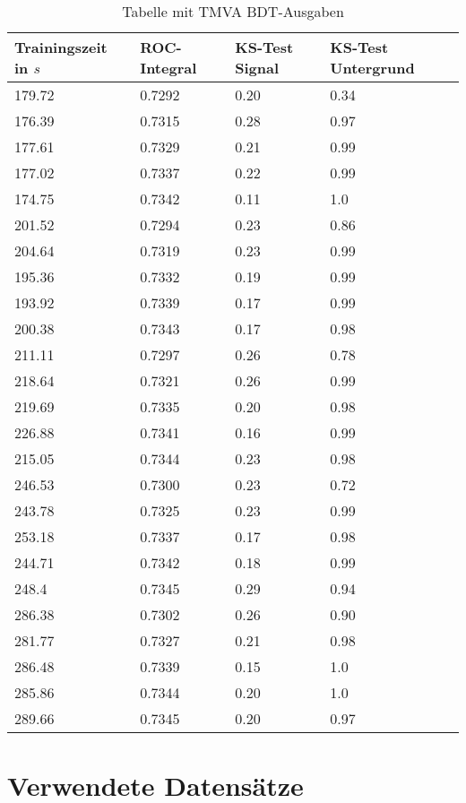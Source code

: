 \begin{table}[tbp]\parbox{12cm}{
  \caption[TMVA 6j4t Ergebnisse]{Tabelle mit TMVA BDT-Ausgaben}%
  }\label{tab:tmva}
  \begin{center}
  \begin{tabular}{llll}
  \hline
  Trainingszeit in $s$ & ROC-Integral & KS-Test Signal & KS-Test Untergrund\\
  \hline
  \hline
179.72 & 0.7292 & 0.20 & 0.34\\ 
176.39 & 0.7315 & 0.28 & 0.97\\ 
177.61 & 0.7329 & 0.21 & 0.99\\ 
177.02 & 0.7337 & 0.22 & 0.99\\ 
174.75 & 0.7342 & 0.11 & 1.0\\ 
201.52 & 0.7294 & 0.23 & 0.86\\ 
204.64 & 0.7319 & 0.23 & 0.99\\ 
195.36 & 0.7332 & 0.19 & 0.99\\ 
193.92 & 0.7339 & 0.17 & 0.99\\ 
200.38 & 0.7343 & 0.17 & 0.98\\ 
211.11 & 0.7297 & 0.26 & 0.78\\ 
218.64 & 0.7321 & 0.26 & 0.99\\ 
219.69 & 0.7335 & 0.20 & 0.98\\ 
226.88 & 0.7341 & 0.16 & 0.99\\ 
215.05 & 0.7344 & 0.23 & 0.98\\ 
246.53 & 0.7300 & 0.23 & 0.72\\ 
243.78 & 0.7325 & 0.23 & 0.99\\
253.18 & 0.7337 & 0.17 & 0.98\\ 
244.71 & 0.7342 & 0.18 & 0.99\\ 
248.4  & 0.7345 & 0.29 & 0.94\\ 
286.38 & 0.7302 & 0.26 & 0.90\\ 
281.77 & 0.7327 & 0.21 & 0.98\\ 
286.48 & 0.7339 & 0.15 & 1.0\\ 
285.86 & 0.7344 & 0.20 & 1.0\\ 
289.66 & 0.7345 & 0.20 & 0.97\\ 
  \hline
  \end{tabular}
  \end{center}
\end{table}

\section{Verwendete Datens\"atze}
\label{ch:Vergleich:sec:Daten}

